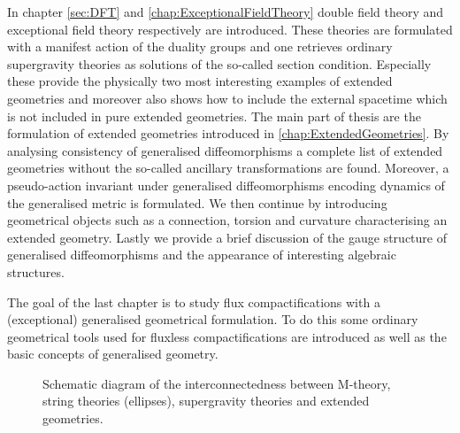 In chapter \ref{sec:DFT} and \ref{chap:ExceptionalFieldTheory} double field theory and exceptional field theory respectively are introduced. These theories are formulated with a manifest action of the duality groups and one retrieves ordinary supergravity theories as solutions of the so-called section condition. Especially these provide the physically two most interesting examples of extended geometries and moreover also shows how to include the external spacetime which is not included in pure extended geometries. The main part of thesis are the formulation of extended geometries introduced in \ref{chap:ExtendedGeometries}. By analysing consistency of generalised diffeomorphisms a complete list of extended geometries without the so-called ancillary transformations are found. Moreover, a pseudo-action invariant under generalised diffeomorphisms encoding dynamics of the generalised metric is formulated. We then continue by introducing geometrical objects such as a connection, torsion and curvature characterising an extended geometry. Lastly we provide a brief discussion of the gauge structure of generalised diffeomorphisms and the appearance of interesting algebraic structures. 

The goal of the last chapter is to study flux compactifications with a (exceptional) generalised geometrical formulation. To do this some ordinary geometrical tools used for fluxless compactifications are introduced as well as the basic concepts of generalised geometry. %





\begin{figure}
    \caption{Schematic diagram of the interconnectedness between M-theory, string theories (ellipses), supergravity theories and extended geometries.}
    \label{fig:TheGodFather}
\end{figure}


